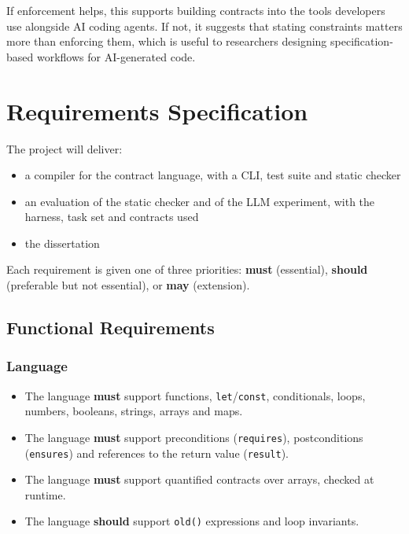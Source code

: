 \documentclass[11pt,a4paper,titlepage]{article}
\begin{document}
If enforcement helps, this supports building contracts into the tools developers use alongside AI coding agents. If not, it suggests that stating constraints matters more than enforcing them, which is useful to researchers designing specification-based workflows for AI-generated code.

\section{Requirements Specification}

The project will deliver:
\begin{itemize}
  \item a compiler for the contract language, with a CLI, test suite and static checker
  \item an evaluation of the static checker and of the LLM experiment, with the harness, task set and contracts used
  \item the dissertation
\end{itemize}

Each requirement is given one of three priorities: \textbf{must} (essential), \textbf{should} (preferable but not essential), or \textbf{may} (extension).

\subsection{Functional Requirements}

\subsubsection{Language}
\begin{itemize}
  \item The language \textbf{must} support functions, \texttt{let}/\texttt{const}, conditionals, loops, numbers, booleans, strings, arrays and maps.
  \item The language \textbf{must} support preconditions (\texttt{requires}), postconditions (\texttt{ensures}) and references to the return value (\texttt{result}).
  \item The language \textbf{must} support quantified contracts over arrays, checked at runtime.
  \item The language \textbf{should} support \texttt{old()} expressions and loop invariants.
\end{itemize}
\end{document}
